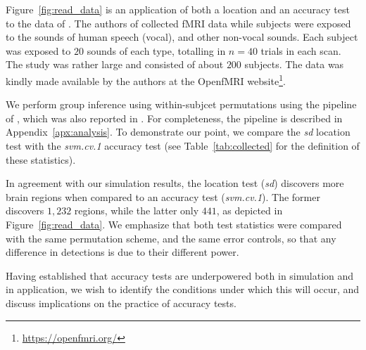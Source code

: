 \documentclass[12pt,a4paper]{article}
\begin{document}
Figure~\ref{fig:read_data} is an application of both a location and an accuracy test to the data of \cite{pernet_human_2015}. 
The authors of \cite{pernet_human_2015} collected fMRI data while subjects were exposed to the sounds of human speech (vocal), and other non-vocal sounds. 
Each subject was exposed to $20$ sounds of each type, totalling in $n=40$ trials in each scan.
The study was rather large and consisted of about $200$ subjects.
The data was kindly made available by the authors at the OpenfMRI website\footnote{\url{https://openfmri.org/}}.

We perform group inference using within-subjcet permutations using the pipeline of \cite{stelzer_statistical_2013}, which was also reported in \cite{gilron_quantifying_2016}. 
For completeness, the pipeline is described in Appendix~\ref{apx:analysis}. 
To demonstrate our point, we compare the \emph{sd} location test with the \emph{svm.cv.1} accuracy test (see Table~\ref{tab:collected} for the definition of these statistics). 

In agreement with our simulation results, the location test (\emph{sd}) discovers more brain regions when compared to an accuracy test (\emph{svm.cv.1}).
The former discovers $1,232$ regions, while the latter only $441$, as depicted in Figure~\ref{fig:read_data}.
We emphasize that both test statistics were compared with the same permutation scheme, and the same error controls, so that any difference in detections is due to their different power.

Having established that accuracy tests are underpowered both in simulation and in application, we wish to identify the conditions under which this will occur, and discuss implications on the practice of accuracy tests. 
\end{document}
